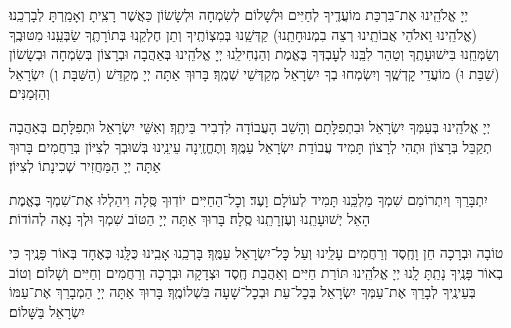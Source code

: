 \documentclass[twoside, openany, parskip=half, 11pt]{book}
\begin{document}
יְיָ אֱלֹהֵֽינוּ אֶת־בִּרְכַּת מוֹעֲדֶֽיךָ לְחַיִּים וּלְשָׁלוֹם לְשִׂמְחָה וּלְשָׂשׂוֹן כַּאֲשֶׁר רָצִֽיתָ וְאָמַֽרְתָּ לְבָרְכֵֽנוּ׃ (\shabbos אֱלֹהֵֽינוּ וֵאלֹהֵי אֲבוֹתֵֽינוּ רְצֵה בִמְנוּחָתֵֽנוּ) קַדְּשֵֽׁנוּ בְּמִצְוֹתֶֽיךָ וְתֵן חֶלְקֵֽנוּ בְּתוֹרָתֶֽךָ שַׂבְּעֵֽנוּ מִטּוּבֶֽךָ וְשַׂמְּחֵֽנוּ בִּישׁוּעָתֶֽךָ וְטַהֵר לִבֵּֽנוּ לְעׇבְדְּךָ בֶּאֱמֶת וְהַנְחִילֵֽנוּ יְיָ אֱלֹהֵֽינוּ בְּאַהֲבָה וּבְרָצוֹן בְּשִׂמְחָה וּבְשָׂשׂוֹן (\shabbos שַׁבַּת וּ) מוֹעֲדֵי קׇדְשֶֽׁךָ וְיִשְׂמְחוּ בְךָ יִשְׂרָאֵל מְקַדְּשֵׁי שְׁמֶֽךָ׃ בָּרוּךְ אַתָּה יְיָ מְקַדֵּשׁ
(\shabbos הַשַּׁבָּת וְ) יִשְׂרָאֵל וְהַזְּמַנִּים׃


יְיָ אֱלֹהֵֽינוּ בְּעַמְּךָ יִשְׂרָאֵל וּבִתְפִלָּתָם וְהָשֵׁב הָעֲבוֹדָה לִדְבִיר בֵּיתֶֽךָ׃ וְאִשֵּׁי יִשְׂרָאֵל וּתְפִלָּתָם בְּאַהֲבָה תְקַבֵּל בְּרָצוֹן וּתְהִי לְרָצוֹן תָּמִיד עֲבוֹדַת יִשְׂרָאֵל עַמֶּֽךָ׃ וְתֶחֱזֶֽינָה עֵינֵֽינוּ בְּשׁוּבְךָ לְצִיּוֹן בְּרַחֲמִים׃ בָּרוּךְ אַתָּה יְיָ הַמַּחֲזִיר שְׁכִינָתוֹ לְצִיּוֹן׃

\modim

יִתְבָּרַךְ וְיִתְרוֹמַם שִׁמְךָ מַלְכֵּֽנוּ תָּמִיד לְעוֹלָם וָעֶד׃ וְכׇל־הַחַיִּים יוֹדֽוּךָ סֶּֽלָה וִיהַלְלוּ אֶת־שִׁמְךָ בֶּאֱמֶת הָאֵל יְשׁוּעָתֵֽנוּ וְעֶזְרָתֵֽנוּ סֶֽלָה׃ בָּרוּךְ אַתָּה יְיָ הַטּוֹב שִׁמְךָ וּלְךָ נָאֶה לְהוֹדוֹת׃



טוֹבָה וּבְרָכָה חֵן וָחֶֽסֶד וְרַחֲמִים עָלֵֽינוּ וְעַל כׇּל־יִשְׂרָאֵל עַמֶּֽךָ׃ בָּרְכֵֽנוּ אָבִֽינוּ כֻּלָּֽנוּ כְּאֶחָד בְּאוֹר פָּנֶֽיךָ כִּי בְאוֹר פָּנֶֽיךָ נָתַֽתָּ לָֽנוּ יְיָ אֱלֹהֵֽינוּ תּוֹרַת חַיִּים וְאַהֲבַת חֶֽסֶד וּצְדָקָה וּבְרָכָה וְרַחֲמִים וְחַיִּים וְשָׁלוֹם׃ וְטוֹב בְּעֵינֶֽיךָ לְבָרֵךְ אֶת־עַמְּךָ יִשְׂרָאֵל בְּכׇל־עֵת וּבְכׇל־שָׁעָה בִּשְׁלוֹמֶֽךָ׃ בָּרוּךְ אַתָּה יְיָ הַמְבָרֵךְ אֶת־עַמּוֹ יִשְׂרָאֵל בַּשָּׁלוֹם׃

\tachanunim

\vfill


\\

\sepline

\\
\\
\end{document}
